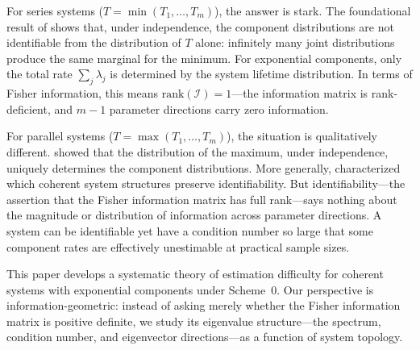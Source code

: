 \documentclass[12pt]{article}
\theoremstyle{definition}
\theoremstyle{remark}
\newcommand{\rank}{\mathrm{rank}}
\begin{document}
For series systems ($T = \min(T_1, \ldots, T_m)$), the answer is stark.
The foundational result of \citet{Tsiatis1975} shows that, under
independence, the component distributions are not identifiable from
the distribution of $T$ alone: infinitely many joint distributions
produce the same marginal for the minimum.  For exponential components,
only the total rate $\sum_j \lambda_j$ is determined by the system
lifetime distribution.  In terms of Fisher information, this means
$\rank(\mathcal{I}) = 1$---the information matrix is rank-deficient,
and $m - 1$ parameter directions carry zero information.

For parallel systems ($T = \max(T_1, \ldots, T_m)$), the situation
is qualitatively different.  \citet{BasuGhosh1980} showed that the
distribution of the maximum, under independence, uniquely determines
the component distributions.  More generally, \citet{Nowik1990}
characterized which coherent system structures preserve
identifiability.  But identifiability---the assertion that the Fisher
information matrix has full rank---says nothing about the magnitude
or distribution of information across parameter directions.  A system
can be identifiable yet have a condition number so large that some
component rates are effectively unestimable at practical sample sizes.

This paper develops a systematic theory of estimation difficulty for
coherent systems with exponential components under Scheme~0.  Our
perspective is information-geometric: instead of asking merely
whether the Fisher information matrix is positive definite, we study
its eigenvalue structure---the spectrum, condition number, and
eigenvector directions---as a function of system topology.
\end{document}
